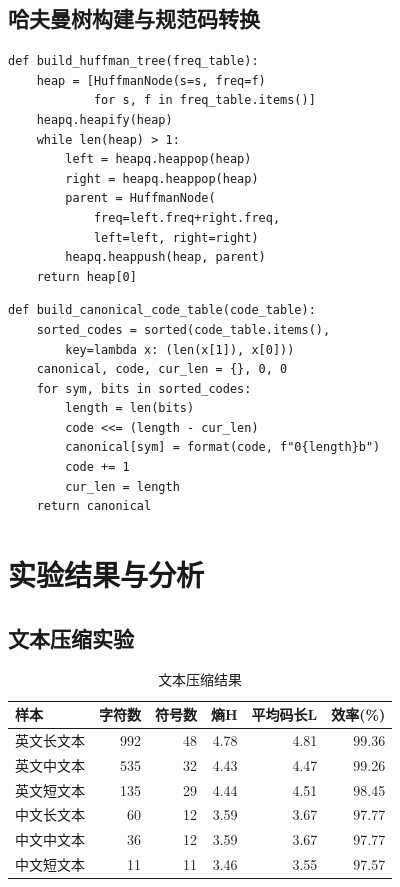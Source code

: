 \documentclass[12pt,a4paper,oneside]{ctexart}
\begin{document}
\subsection{哈夫曼树构建与规范码转换}
\begin{lstlisting}[caption={哈夫曼树构建}]
def build_huffman_tree(freq_table):
    heap = [HuffmanNode(s=s, freq=f)
            for s, f in freq_table.items()]
    heapq.heapify(heap)
    while len(heap) > 1:
        left = heapq.heappop(heap)
        right = heapq.heappop(heap)
        parent = HuffmanNode(
            freq=left.freq+right.freq,
            left=left, right=right)
        heapq.heappush(heap, parent)
    return heap[0]
\end{lstlisting}

\begin{lstlisting}[caption={规范码转换}]
def build_canonical_code_table(code_table):
    sorted_codes = sorted(code_table.items(),
        key=lambda x: (len(x[1]), x[0]))
    canonical, code, cur_len = {}, 0, 0
    for sym, bits in sorted_codes:
        length = len(bits)
        code <<= (length - cur_len)
        canonical[sym] = format(code, f"0{length}b")
        code += 1
        cur_len = length
    return canonical
\end{lstlisting}

\section{实验结果与分析}
\subsection{文本压缩实验}
\begin{table}[H]
\centering\caption{文本压缩结果}\small
\begin{tabular}{lrrrrr}
\toprule
样本 & 字符数 & 符号数 & 熵H & 平均码长L & 效率(\%) \\
\midrule
英文长文本 & 992 & 48 & 4.78 & 4.81 & 99.36 \\
英文中文本 & 535 & 32 & 4.43 & 4.47 & 99.26 \\
英文短文本 & 135 & 29 & 4.44 & 4.51 & 98.45 \\
中文长文本 & 60 & 12 & 3.59 & 3.67 & 97.77 \\
中文中文本 & 36 & 12 & 3.59 & 3.67 & 97.77 \\
中文短文本 & 11 & 11 & 3.46 & 3.55 & 97.57 \\
\bottomrule
\end{tabular}
\end{table}
\end{document}
